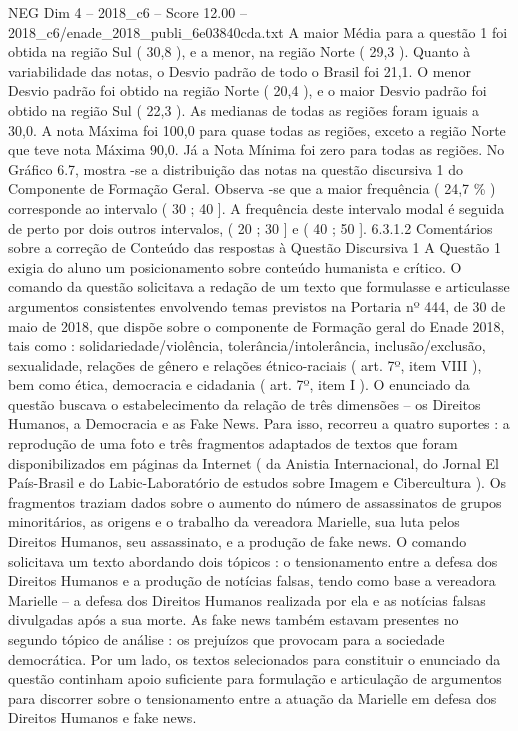 \begin{textsample}{NEG Dim 4 – 2018\_c6 – Score 12.00 – 2018\_c6/enade\_2018\_publi\_6e03840cda.txt}
A maior Média para a questão 1 foi obtida na região Sul ( 30,8 ), e a menor, na região Norte ( 29,3 ).
Quanto à variabilidade das notas, o Desvio padrão de todo o Brasil foi 21,1.
O menor Desvio padrão foi obtido na região Norte ( 20,4 ), e o maior Desvio padrão foi obtido na região Sul ( 22,3 ).
As medianas de todas as regiões foram iguais a 30,0.
A nota Máxima foi 100,0 para quase todas as regiões, exceto a região Norte que teve nota Máxima 90,0.
Já a Nota Mínima foi zero para todas as regiões.
No Gráfico 6.7, mostra -se a distribuição das notas na questão discursiva 1 do Componente de Formação Geral.
Observa -se que a maior frequência ( 24,7 \% ) corresponde ao intervalo ( 30 ; 40 ].
A frequência deste intervalo modal é seguida de perto por dois outros intervalos, ( 20 ; 30 ] e ( 40 ; 50 ]. 6.3.1.2 Comentários sobre a correção de Conteúdo das respostas à Questão Discursiva 1 A Questão 1 exigia do aluno um posicionamento sobre conteúdo humanista e crítico.
O comando da questão solicitava a redação de um texto que formulasse e articulasse argumentos consistentes envolvendo temas previstos na Portaria nº 444, de 30 de maio de 2018, que dispõe sobre o componente de Formação geral do Enade 2018, tais como : solidariedade/violência, tolerância/intolerância, inclusão/exclusão, sexualidade, relações de gênero e relações étnico-raciais ( art. 7º, item VIII ), bem como ética, democracia e cidadania ( art. 7º, item I ).
O enunciado da questão buscava o estabelecimento da relação de três dimensões – os Direitos Humanos, a Democracia e as Fake News.
Para isso, recorreu a quatro suportes : a reprodução de uma foto e três fragmentos adaptados de textos que foram disponibilizados em páginas da Internet ( da Anistia Internacional, do Jornal El País-Brasil e do Labic-Laboratório de estudos sobre Imagem e Cibercultura ).
Os fragmentos traziam dados sobre o aumento do número de assassinatos de grupos minoritários, as origens e o trabalho da vereadora Marielle, sua luta pelos Direitos Humanos, seu assassinato, e a produção de fake news.
O comando solicitava um texto abordando dois tópicos : o tensionamento entre a defesa dos Direitos Humanos e a produção de notícias falsas, tendo como base a vereadora Marielle – a defesa dos Direitos Humanos realizada por ela e as notícias falsas divulgadas após a sua morte.
As fake news também estavam presentes no segundo tópico de análise : os prejuízos que provocam para a sociedade democrática.
Por um lado, os textos selecionados para constituir o enunciado da questão continham apoio suficiente para formulação e articulação de argumentos para discorrer sobre o tensionamento entre a atuação da Marielle em defesa dos Direitos Humanos e fake news.

\end{textsample}

